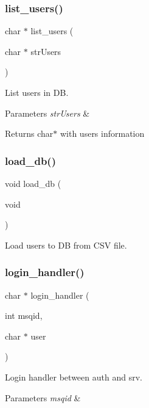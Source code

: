 \subsubsection{list\+\_\+users()}
{\footnotesize\ttfamily char $\ast$ list\+\_\+users (\begin{DoxyParamCaption}\item[{char $\ast$}]{str\+Users }\end{DoxyParamCaption})}



List users in DB. 


\begin{DoxyParams}{Parameters}
{\em str\+Users} & \\
\hline
\end{DoxyParams}
\begin{DoxyReturn}{Returns}
char$\ast$ with users information 
\end{DoxyReturn}
\mbox{\label{auth_8h_aca138a298c612a14d6fb2c16672f8c87}} 
\subsubsection{load\+\_\+db()}
{\footnotesize\ttfamily void load\+\_\+db (\begin{DoxyParamCaption}\item[{void}]{ }\end{DoxyParamCaption})}



Load users to DB from C\+SV file. 

\mbox{\label{auth_8h_a83d64e63f624455cc546824658a42969}} 
\subsubsection{login\+\_\+handler()}
{\footnotesize\ttfamily char $\ast$ login\+\_\+handler (\begin{DoxyParamCaption}\item[{int}]{msqid,  }\item[{char $\ast$}]{user }\end{DoxyParamCaption})}



Login handler between auth and srv. 


\begin{DoxyParams}{Parameters}
{\em msqid} & \\
\hline
\end{DoxyParams}
\mbox{\label{auth_8h_a7145eb48ec5e46fbb39b0b174a026cd1}} 
